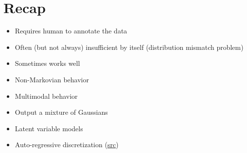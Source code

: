 \section{Recap}
\begin{itemize}
	\item Requires human to annotate the data
	\item Often (but not always) insufficient by itself (distribution mismatch problem)
	\item Sometimes works well
\end{itemize}
\begin{itemize}
	\item Non-Markovian behavior
	\item Multimodal behavior
\end{itemize}
\begin{itemize}
	\item Output a mixture of Gaussians
	\item Latent variable models
	\item Auto-regressive discretization (\href{https://www.youtube.com/watch?v=988gLurg01U&list=PL_iWQOsE6TfURIIhCrlt-wj9ByIVpbfGc&index=7}{src})
\end{itemize}